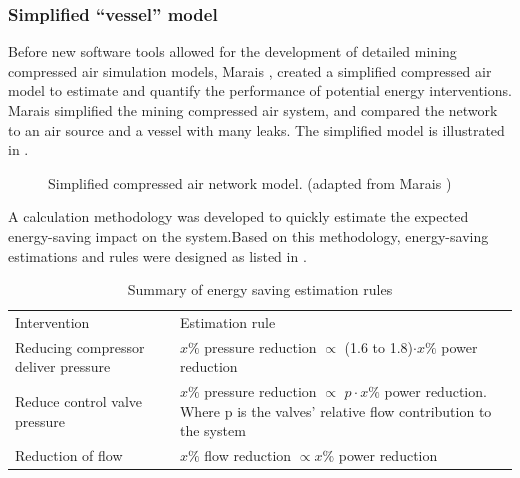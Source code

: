 		\subsubsection{Simplified \enquote{vessel} model}
		Before new software tools allowed for the development of detailed mining compressed air simulation models, Marais \cite{Marais2012PhD}, \cite{marais2013simplification} created a simplified compressed air model to estimate and quantify the performance of potential energy interventions. Marais simplified the mining compressed air system, and compared the network to an air source and a vessel with many leaks. The simplified model is illustrated in .
		\begin{figure}[h!]
			\centering
			\caption[Simplified compressed air netowrk model]{Simplified compressed air network model. (adapted from Marais \cite{Marais2012PhD})}
			\label{fig:Marais vessel model}
		\end{figure}
		\par 
		A calculation methodology was developed to quickly estimate the expected energy-saving impact on the system.Based on this methodology, energy-saving estimations and rules were designed as listed in . \\
		\par 
		\begin{table}[h]
			\caption[Summary of energy saving estimation rules]{Summary of energy saving estimation rules \cite{Marais2012PhD}}
			\centering
			\begin{tabular}{p{}p{}p{}}
				\hline
				Intervention && Estimation rule\\
				\hhline{===} 
				Reducing compressor deliver pressure & & $x \%$ pressure reduction $\propto$ (1.6 to 1.8)$\cdot x\%$ power reduction \newline \\
				Reduce control valve pressure & &$x \%$ pressure reduction $\propto$ $p\cdot x\%$ power reduction. \newline \newline Where p is the valves' relative flow contribution to the system \newline \\
				Reduction of flow && $x \%$ flow reduction $\propto x \%$ power reduction \newline\\
				\hline
			\end{tabular} 
			\label{table: Rules of thumb}
		\end{table}
